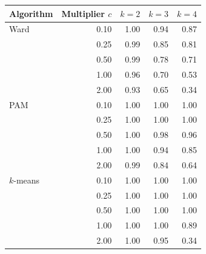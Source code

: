 \begin{tabular}{lrrrr}
\toprule
Algorithm & Multiplier $c$ & $k = 2$ & $k = 3$ & $k = 4$ \\
\midrule
Ward & 0.10 & 1.00 & 0.94 & 0.87 \\
 & 0.25 & 0.99 & 0.85 & 0.81 \\
 & 0.50 & 0.99 & 0.78 & 0.71 \\
 & 1.00 & 0.96 & 0.70 & 0.53 \\
 & 2.00 & 0.93 & 0.65 & 0.34 \\
PAM & 0.10 & 1.00 & 1.00 & 1.00 \\
 & 0.25 & 1.00 & 1.00 & 1.00 \\
 & 0.50 & 1.00 & 0.98 & 0.96 \\
 & 1.00 & 1.00 & 0.94 & 0.85 \\
 & 2.00 & 0.99 & 0.84 & 0.64 \\
$k$-means & 0.10 & 1.00 & 1.00 & 1.00 \\
 & 0.25 & 1.00 & 1.00 & 1.00 \\
 & 0.50 & 1.00 & 1.00 & 1.00 \\
 & 1.00 & 1.00 & 1.00 & 0.89 \\
 & 2.00 & 1.00 & 0.95 & 0.34 \\
\bottomrule
\end{tabular}
